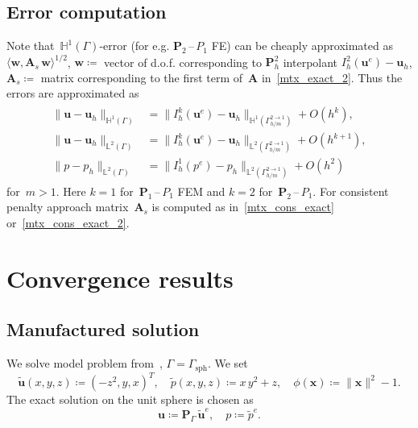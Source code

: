 \documentclass[12pt]{article}
\newcommand{\vect}[1]{\boldsymbol{\mathbf{#1}}}
\newcommand{\sphere}{{\Gamma_{\text{sph}}}}
\newcommand{\LTwoSpace}[1][\Gamma]{{\mathbb L^2\left({#1}\right)}}
\newcommand{\HOneSpace}[1][\Gamma]{{\mathbb H^1\left({#1}\right)}}
\begin{document}
\subsection{Error computation}

Note that~$\HOneSpace$-error (for e.g. $\vect P_2$\,--\,$P_1$ FE) can be cheaply approximated as~$\langle \vect w, \vect A_s\,\vect w \rangle^{1/2}$, $\vect w \coloneqq$ vector of d.o.f. corresponding to $\vect P^2_h$ interpolant $I_h^2(\vect u^e) - \vect u_h$, $\vect A_s \coloneqq$ matrix corresponding to the first term of~$\vect A$ in~\eqref{mtx_exact_2}. Thus the errors are approximated as
\begin{align}\begin{split}
	\| \vect u - \vect u_h \|_{\HOneSpace} &= \| I^k_h(\vect u^e) - \vect u_h \|_{\HOneSpace[\Gamma_{h/m}^{2 \to 1}]} + O(h^{k}), \\
	\| \vect u - \vect u_h \|_{\LTwoSpace} &= \| I^k_h(\vect u^e) - \vect u_h \|_{\LTwoSpace[\Gamma_{h/m}^{2 \to 1}]} + O(h^{k+1}), \\
	\| p - p_h \|_{\LTwoSpace} &= \| I^1_h(p^e) - p_h \|_{\LTwoSpace[\Gamma_{h/m}^{2 \to 1}]} + O(h^2)
\end{split}\end{align}
for~$m > 1$. Here $k = 1$ for~$\vect P_1$\,--\,$P_1$ FEM and $k = 2$ for~$\vect P_2$\,--\,$P_1$. For consistent penalty approach matrix~$\vect A_s$ is computed as in~\eqref{mtx_cons_exact} or~\eqref{mtx_cons_exact_2}.

\section{Convergence results}\label{sec:conv}

\subsection{Manufactured solution}

We solve model problem from~\cite[p.\,20]{surfstokes}, $\Gamma = \sphere$\footnotemark{}. We set
\begin{equation}\label{exact_soln}
	\tilde{\vect u}(x, y, z) \coloneqq (-z^2, y, x)^T, \quad
	\tilde p(x, y, z) \coloneqq x\,y^2 + z, \quad
	\phi(\vect x) \coloneqq \|\vect x\|^2 - 1.
\end{equation}
The exact solution on the unit sphere is chosen as 
\begin{equation}\label{exact_soln_2}
	\vect u \coloneqq \vect P_\Gamma\,\tilde{\vect u}^e, \quad
	p \coloneqq \tilde p^e.
\end{equation}
\end{document}
